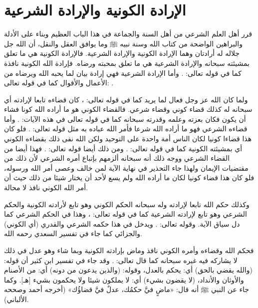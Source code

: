 \section{الإرادة الكونية والإرادة الشرعية}

قرر أهل العلم الشرعي من أهل السنة والجماعة في هذا الباب العظيم وبناء على الأدلة والبراهين الواضحة من كتاب الله وسنة نبيه ﷺ وما يوافق العقل والنقل، أن الله جل جلاله له أرادتان وهما الإرادة الكونية والإرادة الشرعية. فالإرادة الكونية هي ما تعلق بمشيئته سبحانه والإرادة الشرعية هي ما تعلق بمحبته ورضاه. فإرادة الله الكونية نافذة كما في قوله تعالى:
\quranayah*[36][82]{\footnotesize \surahname*[36]}. وأما الإرادة الشرعية فهي إرادة بيان لما يحبه الله ويرضاه من الأعمال والأقوال كما في قوله تعالى:
\quranayah*[4][26-28]{\footnotesize \surahname*[4]}.

ولما كان الله عز وجل فعال لما يريد كما في قوله تعالى:
\quranayah*[85][16]{\footnotesize \surahname*[16]}، كان قضاءه تابعا لإرادته أي سبحانه له كذلك قضاء كوني وقضاء شرعي. فالقضاء الكوني هو ما أراده الله كونا فشاء أن يكون فكان بعزته وعلمه وقدرته سبحانه كما في قوله تعالى في هذه الآيات:
\quranayah*[2][117]{\footnotesize \surahname*[2]}. %
وأما قضاءه الشرعي فهو ما أراده الله شرعا فأمر الله عباده به مثل قوله تعالى:
\quranayah*[17][23]{\footnotesize \surahname*[17]}. فلو كان هذا قضاءا كونيا لكان الناس أمة واحدة على التوحيد ولكن الله نفى ذلك بقضاءه الكوني أي بمشيئته الكونية كما في قوله تعالى: \quranayah*[16][93]{\footnotesize \surahname*[16]}.
ومن ذلك أيضا قوله تعالى:
\quranayah*[33][36]{\footnotesize \surahname*[33]}. فهذا أيضا من القضاء الشرعي ووجه ذلك أنه سبحانه ألزمهم بإتباع أمره الشرعي لأن ذلك من مقتضيات الإيمان ولهذا جاء التحذير في نهاية الآية لمن خالف وعصى أمر الله ورسوله، فلو كان هذا قضاء كونيا لكان ما أراده الله ولم يسع لأحد أن يختار شيئا من ذلك حيث أن أمر الله الكوني نافذ لا محالة.

وكذلك حكم الله تابعا لإرادته وله سبحانه الحكم الكوني وهو تابع لأرادته الكونية والحكم الشرعي وهو تابع لإرادته الشرعية كما في قوله تعالى:
\quranayah*[5][1]{\footnotesize \surahname*[5]}، وهذا في الحكم الشرعي كما دل سياق الآية. وقوله تعالى:
\quranayah*[13][41]{\footnotesize \surahname*[13]}. ويدخل في هذا حكمه الشرعي والقدري (أي الكوني) والجزائي كما جاء في تفسير السعدي رحمه الله.


فحكم الله وقضاءه وأمره الكوني نافذ وماض بإرادته الكونية وبما شاء وهو عدل في ذلك لا يشاركه فيه غيره سبحانه كما قال تعالى:
\quranayah*[40][20]{\footnotesize \surahname*[40]}. وقد جاء في تفسير ابن كثير أن قوله: (والله يقضي بالحق) أي: يحكم بالعدل، وقوله: (والذين يدعون من دونه) أي: من الأصنام والأوثان والأنداد، (لا يقضون بشيء) أي: لا يملكون شيئا ولا يحكمون بشيء [هـ]. وكما جاء عن النبي ﷺ أنه قال:
«ماضٍ فيَّ حكمُك، عدلٌ فيَّ قضاؤُك» {\footnotesize (أخرجه أحمد وصححه الألباني)}. 

